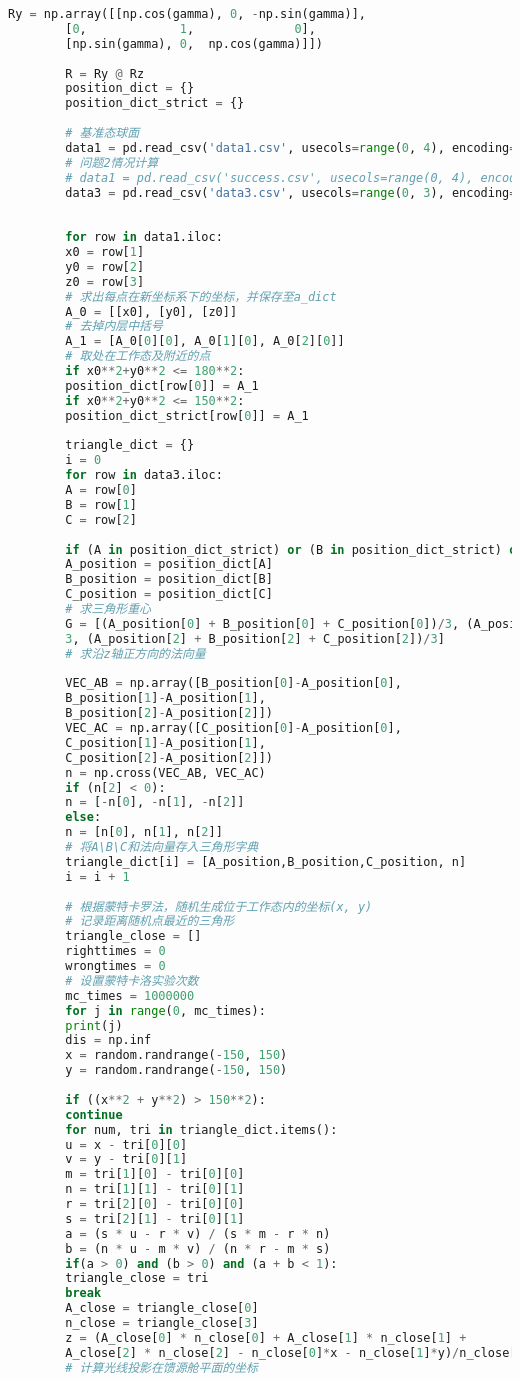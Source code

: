 \documentclass{cumcmthesis}
\begin{document}
\begin{appendices}
\begin{lstlisting}[language={python}]
		Ry = np.array([[np.cos(gamma), 0, -np.sin(gamma)],
		[0,             1,              0],
		[np.sin(gamma), 0,  np.cos(gamma)]])
		
		R = Ry @ Rz
		position_dict = {}
		position_dict_strict = {}
		
		# 基准态球面
		data1 = pd.read_csv('data1.csv', usecols=range(0, 4), encoding="gbk")
		# 问题2情况计算
		# data1 = pd.read_csv('success.csv', usecols=range(0, 4), encoding="gbk")
		data3 = pd.read_csv('data3.csv', usecols=range(0, 3), encoding="gbk")
		
		
		for row in data1.iloc:
		x0 = row[1]
		y0 = row[2]
		z0 = row[3]
		# 求出每点在新坐标系下的坐标，并保存至a_dict
		A_0 = [[x0], [y0], [z0]]
		# 去掉内层中括号
		A_1 = [A_0[0][0], A_0[1][0], A_0[2][0]]
		# 取处在工作态及附近的点
		if x0**2+y0**2 <= 180**2:
		position_dict[row[0]] = A_1
		if x0**2+y0**2 <= 150**2:
		position_dict_strict[row[0]] = A_1
		
		triangle_dict = {}
		i = 0
		for row in data3.iloc:
		A = row[0]
		B = row[1]
		C = row[2]
		
		if (A in position_dict_strict) or (B in position_dict_strict) or (C in position_dict_strict):
		A_position = position_dict[A]
		B_position = position_dict[B]
		C_position = position_dict[C]
		# 求三角形重心
		G = [(A_position[0] + B_position[0] + C_position[0])/3, (A_position[1] + B_position[1] + C_position[1]) /
		3, (A_position[2] + B_position[2] + C_position[2])/3]
		# 求沿z轴正方向的法向量
		
		VEC_AB = np.array([B_position[0]-A_position[0],
		B_position[1]-A_position[1],
		B_position[2]-A_position[2]])
		VEC_AC = np.array([C_position[0]-A_position[0],
		C_position[1]-A_position[1],
		C_position[2]-A_position[2]])
		n = np.cross(VEC_AB, VEC_AC)
		if (n[2] < 0):
		n = [-n[0], -n[1], -n[2]]
		else:
		n = [n[0], n[1], n[2]]
		# 将A\B\C和法向量存入三角形字典
		triangle_dict[i] = [A_position,B_position,C_position, n]
		i = i + 1
		
		# 根据蒙特卡罗法，随机生成位于工作态内的坐标(x, y)
		# 记录距离随机点最近的三角形
		triangle_close = []
		righttimes = 0
		wrongtimes = 0
		# 设置蒙特卡洛实验次数
		mc_times = 1000000
		for j in range(0, mc_times):
		print(j)
		dis = np.inf
		x = random.randrange(-150, 150)
		y = random.randrange(-150, 150)
		
		if ((x**2 + y**2) > 150**2):
		continue
		for num, tri in triangle_dict.items():
		u = x - tri[0][0]
		v = y - tri[0][1]
		m = tri[1][0] - tri[0][0]
		n = tri[1][1] - tri[0][1]
		r = tri[2][0] - tri[0][0]
		s = tri[2][1] - tri[0][1]
		a = (s * u - r * v) / (s * m - r * n)
		b = (n * u - m * v) / (n * r - m * s)
		if(a > 0) and (b > 0) and (a + b < 1):
		triangle_close = tri
		break
		A_close = triangle_close[0]
		n_close = triangle_close[3]
		z = (A_close[0] * n_close[0] + A_close[1] * n_close[1] +
		A_close[2] * n_close[2] - n_close[0]*x - n_close[1]*y)/n_close[2]
		# 计算光线投影在馈源舱平面的坐标
		

\end{lstlisting}
\end{appendices}
\end{document}
